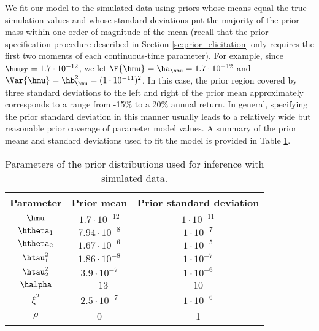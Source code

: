 We fit our model to the simulated data using priors whose means equal
the true simulation values and whose standard deviations put the
majority of the prior mass within one order of magnitude of the mean
(recall that the prior specification procedure described in Section
\ref{se:prior_elicitation} only requires the first two moments of each
continuous-time parameter). For example, since
$\hmu_T = 1.7 \cdot 10^{-12}$, we let
$\E{\hmu} = \ha_{\hmu} = 1.7 \cdot 10^{-12}$ and
$\Var{\hmu} = \hb_{\hmu}^2 = (1 \cdot 10^{-11})^2$. In this case, the
prior region covered by three standard deviations to the left and
right of the prior mean approximately corresponds to a range from
-15\% to a 20\% annual return.  In general, specifying the prior
standard deviation in this manner usually leads to a relatively wide
but reasonable prior coverage of parameter model values. A summary of
the prior means and standard deviations used to fit the model is
provided in Table \ref{ta:priors}.
\begin{table}[h]
\begin{center}
\begin{tabular}{c|c|c}
  Parameter & Prior mean & Prior standard deviation \\ \hline
  $\hmu$ & $1.7 \cdot 10^{-12}$ & $1 \cdot 10^{-11}$  \\
  $\htheta_1$ & $7.94 \cdot 10^{-8}$ & $1 \cdot 10^{-7}$  \\
  $\htheta_2$ & $1.67 \cdot 10^{-6}$ & $1 \cdot 10^{-5}$  \\
  $\htau_1^2$ & $1.86\cdot 10^{-8}$ & $1\cdot 10^{-7}$  \\
  $\htau_2^2$ & $3.9\cdot 10^{-7}$ & $1\cdot 10^{-6}$  \\
  $\halpha$ & $-13$ & $10$  \\
  $\xi^2$ & $2.5 \cdot 10^{-7}$ & $1\cdot 10^{-6}$ \\
  $\rho$ & 0 & 1
\end{tabular}
\caption{Parameters of the prior distributions used for inference with simulated data.}\label{ta:priors}
\end{center}
\end{table}




